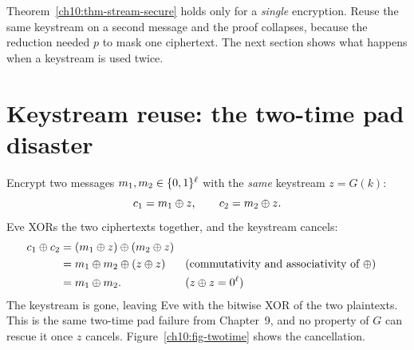 Theorem~\ref{ch10:thm-stream-secure} holds only for a \emph{single} encryption. Reuse the same keystream on a second message and the proof collapses, because the reduction needed $p$ to mask one ciphertext. The next section shows what happens when a keystream is used twice.

\section{Keystream reuse: the two-time pad disaster}
\label{ch10:reuse}

Encrypt two messages $m_1, m_2 \in \{0,1\}^\ell$ with the \emph{same} keystream $z = G(k)$:
\[
  c_1 = m_1 \oplus z, \qquad c_2 = m_2 \oplus z.
\]
Eve XORs the two ciphertexts together, and the keystream cancels:
\begin{align*}
  c_1 \oplus c_2
  &= (m_1 \oplus z) \oplus (m_2 \oplus z) \\
  &= m_1 \oplus m_2 \oplus (z \oplus z) && \text{(commutativity and associativity of $\oplus$)} \\
  &= m_1 \oplus m_2 . && \text{($z \oplus z = 0^\ell$)}
\end{align*}
The keystream is gone, leaving Eve with the bitwise XOR of the two plaintexts. This is the same two-time pad failure from Chapter~9, and no property of $G$ can rescue it once $z$ cancels. Figure~\ref{ch10:fig-twotime} shows the cancellation.

